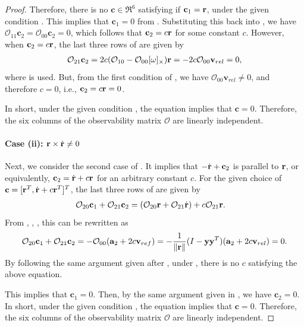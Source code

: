 \begin{proof}
Therefore, there is no $\mathbf{c}\in\Re^6$ satisfying  if $\mathbf{c}_1=\mathbf{r}$, under the given condition . This implies that $\mathbf{c}_1=0$ from . Substituting this back into , we have $\mathcal{O}_{11}\mathbf{c}_2=\mathcal{O}_{00}\mathbf{c}_2=0$, which follows that $\mathbf{c}_2=c\mathbf{r}$ for some constant $c$. However, when $\mathbf{c}_2=c\mathbf{r}$, the last three rows of  are given by
\begin{align}
\mathcal{O}_{21}\mathbf{c}_2 = 2c(\mathcal{O}_{10}-\mathcal{O}_{00}[\omega]_\times) \mathbf{r}
= -2c\mathcal{O}_{00}\mathbf{v}_{rel}=0,\label{eqn:row3i1}
\end{align}
where  is used. But, from the first condition of , we have $\mathcal{O}_{00}\mathbf{v}_{rel}\neq 0$, and therefore $c=0$, i.e., $\mathbf{c}_2=c\mathbf{r} =0$.

In short, under the given condition , the equation  implies that $\mathbf{c}=0$. Therefore, the six columns of the observability matrix $\mathcal{O}$ are linearly independent. 

\paragraph{Case (ii): $\mathbf{r}\times\dot {\mathbf{r}}\neq0$} Next, we consider the second case of . It implies that $-\dot{\mathbf{r}} + \mathbf{c}_2$ is parallel to $\mathbf{r}$, or equivalently, $\mathbf{c}_2 = \dot{\mathbf{r}} + c\mathbf{r}$ for an arbitrary constant $c$. For the given choice of $\mathbf{c}=[\mathbf{r}^T,\dot{\mathbf{r}}+ c\mathbf{r}^T]^T$, the last three rows of  are given by
\begin{align*}
\mathcal{O}_{20} \mathbf{c}_1 +\mathcal{O}_{21} \mathbf{c}_2 
& = (\mathcal{O}_{20} \mathbf{r}+\mathcal{O}_{21}\dot{\mathbf{r}}) + c\mathcal{O}_{21} \mathbf{r}.
\end{align*}
From , , , this can be rewritten as
\begin{align*}
\mathcal{O}_{20} \mathbf{c}_1 +\mathcal{O}_{21} \mathbf{c}_2 
= -\mathcal{O}_{00}(\mathbf{a}_2+2c\mathbf{v}_{ref})= -\frac{1}{\|\mathbf{r}\|}(I-\mathbf{y}\mathbf{y}^T)(\mathbf{a}_2+2c\mathbf{v}_{rel})=0.
\end{align*}
By following the same argument given after , under , there is no $c$ satisfying the above equation. 

This implies that $\mathbf{c}_1=0$. Then, by the same argument given in , we have $\mathbf{c}_2=0$. In short, under the given condition , the equation  implies that $\mathbf{c}=0$. Therefore, the six columns of the observability matrix $\mathcal{O}$ are linearly independent. 
\end{proof}

